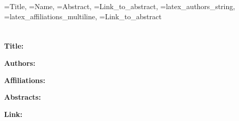 \documentclass[a4paper,12pt]{article}
\begin{document}
\tableofcontents

\newpage

  {\Title=Title, 
  \Name=Name, 
  \Abstract=Abstract, 
  \Linktotheabstract=Link_to_abstract, 
  \Authors=latex_authors_string, 
  \Affiliations=latex_affiliations_multiline,
  \URL=Link_to_abstract}
  {
    \section[\texorpdfstring{\Name}{Name}]{\Name}
    \label{abs:\Name}

    \textbf{Title:} \Title

    \textbf{Authors:} \Authors

    \textbf{Affiliations:} \Affiliations

    \textbf{Abstracts:} \Abstract

    \textbf{Link:} \href{\URL}{\URL}

    \newpage
  }
\end{document}
